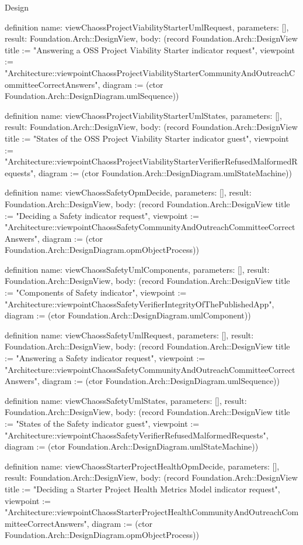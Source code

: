 \begin{lexlean}{Design}
\begin{semanticmodule}
definition{
  name: viewChaossProjectViabilityStarterUmlRequest,
  parameters: [],
  result: Foundation.Arch::DesignView,
  body: (record Foundation.Arch::DesignView {title := "Answering a OSS Project Viability Starter indicator request", viewpoint := "Architecture::viewpointChaossProjectViabilityStarterCommunityAndOutreachCommitteeCorrectAnswers", diagram := (ctor Foundation.Arch::DesignDiagram.umlSequence)})
}

definition{
  name: viewChaossProjectViabilityStarterUmlStates,
  parameters: [],
  result: Foundation.Arch::DesignView,
  body: (record Foundation.Arch::DesignView {title := "States of the OSS Project Viability Starter indicator guest", viewpoint := "Architecture::viewpointChaossProjectViabilityStarterVerifierRefusedMalformedRequests", diagram := (ctor Foundation.Arch::DesignDiagram.umlStateMachine)})
}

definition{
  name: viewChaossSafetyOpmDecide,
  parameters: [],
  result: Foundation.Arch::DesignView,
  body: (record Foundation.Arch::DesignView {title := "Deciding a Safety indicator request", viewpoint := "Architecture::viewpointChaossSafetyCommunityAndOutreachCommitteeCorrectAnswers", diagram := (ctor Foundation.Arch::DesignDiagram.opmObjectProcess)})
}

definition{
  name: viewChaossSafetyUmlComponents,
  parameters: [],
  result: Foundation.Arch::DesignView,
  body: (record Foundation.Arch::DesignView {title := "Components of Safety indicator", viewpoint := "Architecture::viewpointChaossSafetyVerifierIntegrityOfThePublishedApp", diagram := (ctor Foundation.Arch::DesignDiagram.umlComponent)})
}

definition{
  name: viewChaossSafetyUmlRequest,
  parameters: [],
  result: Foundation.Arch::DesignView,
  body: (record Foundation.Arch::DesignView {title := "Answering a Safety indicator request", viewpoint := "Architecture::viewpointChaossSafetyCommunityAndOutreachCommitteeCorrectAnswers", diagram := (ctor Foundation.Arch::DesignDiagram.umlSequence)})
}

definition{
  name: viewChaossSafetyUmlStates,
  parameters: [],
  result: Foundation.Arch::DesignView,
  body: (record Foundation.Arch::DesignView {title := "States of the Safety indicator guest", viewpoint := "Architecture::viewpointChaossSafetyVerifierRefusedMalformedRequests", diagram := (ctor Foundation.Arch::DesignDiagram.umlStateMachine)})
}

definition{
  name: viewChaossStarterProjectHealthOpmDecide,
  parameters: [],
  result: Foundation.Arch::DesignView,
  body: (record Foundation.Arch::DesignView {title := "Deciding a Starter Project Health Metrics Model indicator request", viewpoint := "Architecture::viewpointChaossStarterProjectHealthCommunityAndOutreachCommitteeCorrectAnswers", diagram := (ctor Foundation.Arch::DesignDiagram.opmObjectProcess)})
}


\end{semanticmodule}
\end{lexlean}
